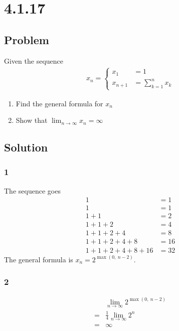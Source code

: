 \documentclass[12pt]{article}
\begin{document}
\section*{4.1.17}

\subsection*{Problem}
Given the sequence
\begin{align}
    x_n = \begin{cases}
        x_1 &= 1 \\
        x_{n + 1} &= \sum_{k = 1}^n x_k
    \end{cases}
\end{align}
\begin{enumerate}
    \item Find the general formula for $x_n$
    \item Show that $\lim_{n \to \infty} x_n = \infty$
\end{enumerate}

\subsection*{Solution}

\subsubsection*{1}
The sequence goes
\begin{align*}
    1 &= 1             \\
    1 &= 1             \\
    1+1 &= 2           \\
    1+1+2 &= 4         \\
    1+1+2+4 &= 8       \\
    1+1+2+4+8 &= 16    \\
    1+1+2+4+8+16 &= 32
\end{align*}
The general formula is $x_n = 2^{\max(0,\ n-2)}$.

\subsubsection*{2}
\begin{align*}
     & \lim_{n\to\infty} 2^{\max(0,\ n-2)} \\
    =& \frac{1}{4} \lim_{n\to\infty} 2^n \\
    =& \infty
\end{align*}
\end{document}
